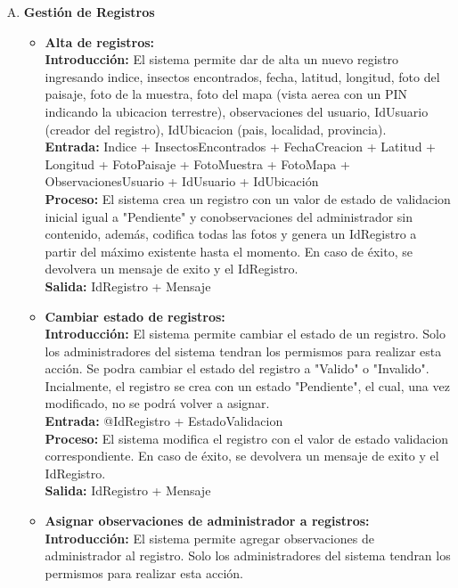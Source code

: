 \begin{enumerate}[A.]
      \item \textbf{Gestión de Registros}
        \begin{itemize}
          \item \textbf{Alta de registros:}
            \\ \textbf{Introducción:} El sistema permite dar de alta un nuevo registro ingresando indice, insectos encontrados, fecha, latitud, longitud, foto del paisaje, foto de la muestra, foto del mapa (vista aerea con un PIN indicando la ubicacion terrestre), observaciones del usuario, IdUsuario (creador del registro), IdUbicacion (pais, localidad, provincia).
            \\ \textbf{Entrada:} Indice + InsectosEncontrados + FechaCreacion + Latitud + Longitud + FotoPaisaje + FotoMuestra + FotoMapa + ObservacionesUsuario + IdUsuario + IdUbicación
            \\ \textbf{Proceso:} El sistema crea un registro con un valor de estado de validacion inicial igual a "Pendiente" y conobservaciones del administrador sin contenido, además, codifica todas las fotos y genera un IdRegistro a partir del máximo existente hasta el momento. En caso de éxito, se devolvera un mensaje de exito y el IdRegistro.
            \\ \textbf{Salida:} IdRegistro + Mensaje
            \\
          \item \textbf{Cambiar estado de registros:}
            \\ \textbf{Introducción:} El sistema permite cambiar el estado de un registro. Solo los administradores del sistema tendran los permismos para realizar esta acción. Se podra cambiar el estado del registro a "Valido" o "Invalido". Incialmente, el registro se crea con un estado "Pendiente", el cual, una vez modificado, no se podrá volver a asignar.
            \\ \textbf{Entrada:} @IdRegistro + EstadoValidacion
            \\ \textbf{Proceso:} El sistema modifica el registro con el valor de estado validacion correspondiente. En caso de éxito, se devolvera un mensaje de exito y el IdRegistro.
            \\ \textbf{Salida:} IdRegistro + Mensaje
            \\
          \item \textbf{Asignar observaciones de administrador a registros:}
            \\ \textbf{Introducción:} El sistema permite agregar observaciones de administrador al registro. Solo los administradores del sistema tendran los permismos para realizar esta acción.

\end{itemize}
\end{enumerate}
